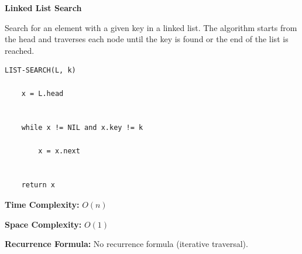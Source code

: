 \documentclass[a4paper,12pt]{article}
\begin{document}
\begin{tcolorbox}[
    colback=gray!30,
    colframe=black,
    boxrule=1pt,
    arc=0mm
]

\begin{tcolorbox}[
    colback=gray!10,
    colframe=black,
    arc=0mm
]
\centering
{\Huge\bfseries Linked List Search}
\end{tcolorbox}


\begin{tcolorbox}[
    colback=gray!10,
    colframe=black,
    arc=0mm
]
\small
Search for an element with a given key in a linked list.
The algorithm starts from the head and traverses each node until
the key is found or the end of the list is reached.
\end{tcolorbox}


\begin{tcolorbox}[
    colback=black!5,
    colframe=black,
    arc=0mm,
    title=Pseudo-code
]
\tiny
\begin{lstlisting}
LIST-SEARCH(L, k)

    x = L.head


    while x != NIL and x.key != k

        x = x.next


    return x
\end{lstlisting}
\end{tcolorbox}


\begin{tcolorbox}[
    colback=cyan!20,
    colframe=black,
    arc=0mm
]
\small
\textbf{Time Complexity:}
$O(n)$
\end{tcolorbox}


\begin{tcolorbox}[
    colback=violet!20,
    colframe=black,
    arc=0mm
]
\small
\textbf{Space Complexity:}
$O(1)$
\end{tcolorbox}


\begin{tcolorbox}[
    colback=pink!20,
    colframe=black,
    arc=0mm
]
\small
\textbf{Recurrence Formula:}
No recurrence formula (iterative traversal).
\end{tcolorbox}

\end{tcolorbox}
\end{document}
